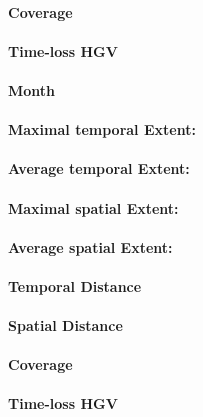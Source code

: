 \paragraph{Coverage}
\paragraph{Time-loss HGV}

\paragraph{Month}

\paragraph{Maximal temporal Extent:}
\paragraph{Average temporal Extent:}
\paragraph{Maximal spatial Extent:}
\paragraph{Average spatial Extent:}
\paragraph{Temporal Distance}
\paragraph{Spatial Distance}
\paragraph{Coverage}
\paragraph{Time-loss HGV}